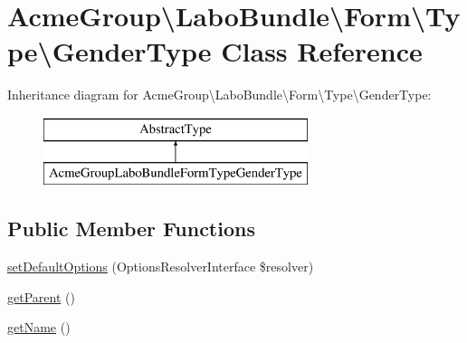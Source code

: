 \hypertarget{class_acme_group_1_1_labo_bundle_1_1_form_1_1_type_1_1_gender_type}{\section{Acme\+Group\textbackslash{}Labo\+Bundle\textbackslash{}Form\textbackslash{}Type\textbackslash{}Gender\+Type Class Reference}
\label{class_acme_group_1_1_labo_bundle_1_1_form_1_1_type_1_1_gender_type}
}
Inheritance diagram for Acme\+Group\textbackslash{}Labo\+Bundle\textbackslash{}Form\textbackslash{}Type\textbackslash{}Gender\+Type\+:\begin{figure}[H]
\begin{center}
\leavevmode
\includegraphics[height=2.000000cm]{class_acme_group_1_1_labo_bundle_1_1_form_1_1_type_1_1_gender_type}
\end{center}
\end{figure}
\subsection*{Public Member Functions}
\begin{DoxyCompactItemize}
\item 
\hyperlink{class_acme_group_1_1_labo_bundle_1_1_form_1_1_type_1_1_gender_type_a99b0f98de923ef06c7d264a09c2eda87}{set\+Default\+Options} (Options\+Resolver\+Interface \$resolver)
\item 
\hyperlink{class_acme_group_1_1_labo_bundle_1_1_form_1_1_type_1_1_gender_type_a6c2eb283e9207b7acc3952a54c2ca45d}{get\+Parent} ()
\item 
\hyperlink{class_acme_group_1_1_labo_bundle_1_1_form_1_1_type_1_1_gender_type_a9e74fe8c53f67645258a60ecd3a39539}{get\+Name} ()
\end{DoxyCompactItemize}


